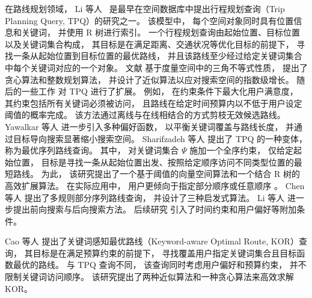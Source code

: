 在路线规划领域， Li 等人~ 是最早在空间数据库中提出行程规划查询（Trip Planning Query, TPQ）的研究之一。 该模型中， 每个空间对象同时具有位置信息和关键词， 并使用 R 树进行索引。 一个行程规划查询由起始位置、目标位置以及关键词集合构成， 其目标是在满足距离、交通状况等优化目标的前提下， 寻找一条从起始位置到目标位置的最优路线， 并且该路线至少经过给定关键词集合中每个关键词对应的一个对象。 文献  基于度量空间中的三角不等式性质， 提出了贪心算法和整数规划算法， 并设计了近似算法以应对搜索空间的指数级增长。 随后的一些工作  对 TPQ 进行了扩展。 例如， 在约束条件下最大化用户满意度， 其约束包括所有关键词必须被访问， 且路线在给定时间预算内以不低于用户设定阈值的概率完成。 该方法通过离线与在线相结合的方式剪枝无效候选路线。 Yawalkar 等人  进一步引入多种偏好函数， 以平衡关键词覆盖与路线长度， 并通过目标导向搜索显著缩小搜索空间。 Sharifzadeh 等人  提出了 TPQ 的一种变体， 称为最优序列路线查询。 其中， 对关键词集合 $\Psi$ 施加一个全序约束， 仅给定起始位置， 目标是寻找一条从起始位置出发、按照给定顺序访问不同类型位置的最短路线。 为此， 该研究提出了一个基于阈值的向量空间算法和一个结合 R 树的高效扩展算法。 在实际应用中， 用户更倾向于指定部分顺序或任意顺序 。 Chen 等人  提出了多规则部分序列路线查询， 并设计了三种启发式算法。 Li 等人  进一步提出前向搜索与后向搜索方法。 后续研究  引入了时间约束和用户偏好等附加条件。

Cao 等人  提出了关键词感知最优路线（Keyword-aware Optimal Route, KOR）查询， 其目标是在满足预算约束的前提下， 寻找覆盖用户指定关键词集合且目标函数最优的路线。 与 TPQ 查询不同， 该查询同时考虑用户偏好和预算约束， 并不限制关键词访问顺序。 该研究提出了两种近似算法和一种贪心算法来高效求解 KOR。

